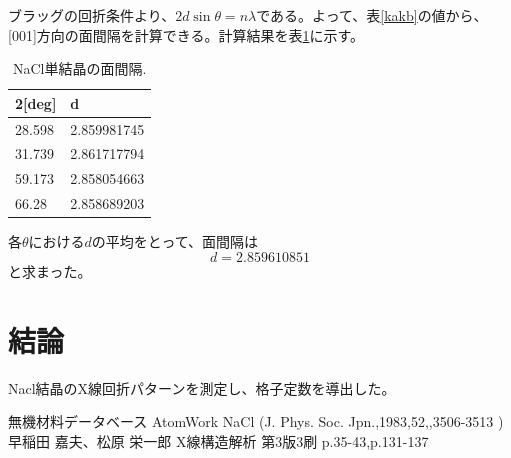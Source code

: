 \documentclass[11pt,a4j,uplatex]{jsarticle}
\begin{document}
 ブラッグの回折条件より、$2d\sin\theta=n\lambda$である。よって、表\ref{kakb}の値から、[001]方向の面間隔を計算できる。計算結果を表\ref{d}に示す。%

 \begin{table}[htbp]
  \begin{center}
   \caption{NaCl単結晶の面間隔.}
   \begin{tabular}{|l|l|}  \hline
    2[deg] & d           \\  \hline  \hline
    28.598 & 2.859981745 \\
    31.739 & 2.861717794 \\
    59.173 & 2.858054663 \\
    66.28  & 2.858689203 \\ \hline
   \end{tabular}
   \label{d}
  \end{center}
 \end{table}

 各$\theta$における$d$の平均をとって、面間隔は
 \begin{equation}
  d=2.859610851
  \label{fin}
 \end{equation}
 と求まった。
\fi

\section{結論}
Nacl結晶のX線回折パターンを測定し、格子定数を導出した。

\begin{thebibliography}{9}
 無機材料データベース AtomWork  NaCl (J. Phys. Soc. Jpn.,1983,52,,3506-3513 )
  早稲田 嘉夫、松原 栄一郎 X線構造解析 第3版3刷 p.35-43,p.131-137


\end{thebibliography}
\end{document}
